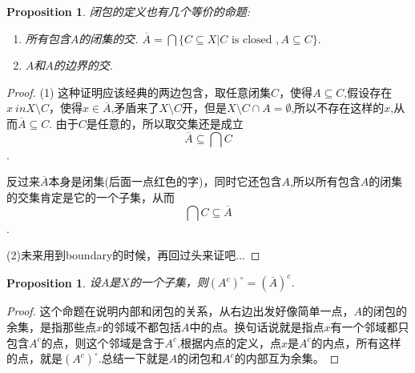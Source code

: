 \documentclass{article}
\newtheorem{proposition}[theorem]{Proposition}
\begin{document}
\begin{proposition}
闭包的定义也有几个等价的命题:
	\begin{enumerate}
		\item 所有包含$A$的闭集的交. $\overline A = \bigcap\{C \subseteq X | C \text{ is closed }, A
\subseteq C\}.$
		\item $A$和$A$的边界的交.
	\end{enumerate}
\end{proposition}

\begin{proof}
(1) 这种证明应该经典的两边包含，取任意闭集$C$，使得$A \subseteq C$,假设存在$x \ in X \setminus C$，使得$x \in \overline{A}$,矛盾来了$X \setminus C$开，但是$X \setminus C \cap A = \emptyset$,所以不存在这样的$x$,从而$\overline{A} \subseteq C$. 由于$C$是任意的，所以取交集还是成立\[\overline{A} \subseteq \bigcap C\].

反过来$\overline{A}$本身是闭集(后面一点红色的字)，同时它还包含$A$,所以所有包含$A$的闭集的交集肯定是它的一个子集，从而\[\bigcap C \subseteq \overline{A}\].

(2)未来用到boundary的时候，再回过头来证吧...
\end{proof}




\begin{proposition}
设$A$是$X$的一个子集，则$(A^{c})^{\circ}=(\overline{A})^c$.
\end{proposition}

\begin{proof}
这个命题在说明内部和闭包的关系，从右边出发好像简单一点，$A$的闭包的余集，是指那些点$x$的邻域不都包括$A$中的点。换句话说就是指点$x$有一个邻域都只包含$A^c$的点，则这个邻域是含于$A^c$,根据内点的定义，点$x$是$A^c$的内点，所有这样的点，就是$(A^c)^{\circ}$.总结一下就是$A$的闭包和$A^c$的内部互为余集。	
\end{proof}
\end{document}
